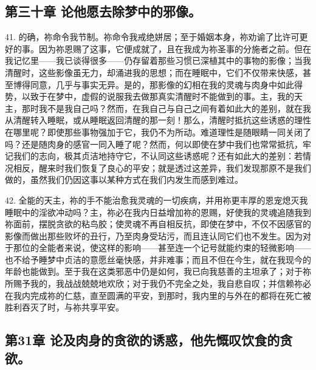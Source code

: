 
\subsection{第三十章 论他愿去除梦中的邪像。}

41. 的确，祢命令我节制。祢命令我戒绝姘居；至于婚姻本身，祢劝谕了比许可更好的事。因为祢恩赐了这事，它便成就了，且在我成为祢圣事的分施者之前。但在我记忆里——我已谈得很多——仍存留着那些习惯已深植其中的事物的影像；当我清醒时，这些影像虽无力，却涌进我的思想；而在睡眠中，它们不仅带来快感，甚至博得同意，几乎与事实无异。是的，那影像的幻相在我的灵魂与肉身中如此得势，以致于在梦中，虚假的说服我去做那真实清醒时不能做到的事。主，我的天主，那时我不是我自己吗？然而，在我自己与自己之间有着如此大的差别，就在我从清醒转入睡眠，或从睡眠返回清醒的那一刻！那么，清醒时抵抗这些诱惑的理性在哪里呢？即使那些事物强加于它，我仍不为所动。难道理性是随眼睛一同关闭了吗？还是随肉身的感官一同入睡了呢？然而，何以即使在梦中我们也常常抵抗，牢记我们的志向，极其贞洁地持守它，不认同这些诱惑呢？还有如此大的差别：若情况相反，醒来时我们恢复了良心的平安；就是透过这差异，我们发现那原不是我们做的，虽然我们仍因这事以某种方式在我们内发生而感到难过。\par

42. 全能的天主，祢的手不能治愈我灵魂的一切疾病，并用祢更丰厚的恩宠熄灭我睡眠中的淫欲冲动吗？主，祢必在我内日益增加祢的恩赐，好使我的灵魂追随我到祢面前，摆脱贪欲的粘鸟胶；使灵魂不再自相反抗，即使在梦中，不仅不因感官的影像而做出那些败坏的丑行，乃至肉身受玷污，而且连认同它们也不发生。因为对于那位的全能者来说，使这样的影响——甚至连一个记号就能约束的轻微影响——也不给予睡梦中贞洁的意愿丝毫快感，并非难事；而且不但在今生，就在我现今的年龄也能做到。至于我在这类邪恶中仍是如何，我已向我慈善的主坦承了；对于祢所赐予我的，我战战兢兢地欢欣；对于我仍不完全之处，我自悲自叹；并信赖祢必在我内完成祢的仁慈，直至圆满的平安，到那时，我内里的与外在的都将在死亡被胜利吞灭了时，与祢共享平安。\par


\subsection{第31章 论及肉身的贪欲的诱惑，他先慨叹饮食的贪欲。}

